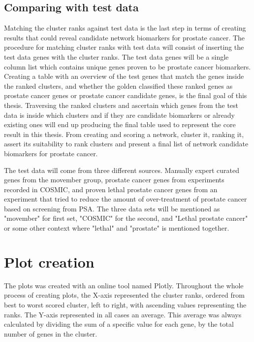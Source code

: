 \subsection{Comparing with test data}
Matching the cluster ranks against test data is the last step in terms of
creating results that could reveal candidate network biomarkers for prostate
cancer. The procedure for matching cluster ranks with test data will consist of
inserting the test data genes with the cluster ranks. The test data genes will
be a single column list which contains unique genes proven to be prostate cancer
biomarkers. Creating a table with an overview of the test genes that match
the genes inside the ranked clusters, and whether the \gls{golden} classified
these ranked genes as prostate cancer genes or prostate cancer candidate genes,
is the final goal of this thesis. Traversing the ranked clusters and ascertain
which genes from the test data is inside which clusters and if they are
candidate biomarkers or already existing ones will end up producing the final
table used to represent the core result in this thesis. From creating and
scoring a network, cluster it, ranking it, assert its suitability to rank
clusters and present a final list of network candidate biomarkers for prostate
cancer.

The test data will come from three different sources. Manually expert curated
genes from the movember group, prostate cancer genes from experiments recorded
in COSMIC\cite{cosmic-download}, and proven lethal prostate cancer genes from an
experiment that tried to reduce the amount of over-treatment of prostate cancer
based on screening from PSA\cite{psa-overtreatment}. The three data sets will be
mentioned as "movember" for first set, "COSMIC" for the second, and "Lethal
prostate cancer" or some other context where "lethal" and "prostate" is
mentioned together.

\section{Plot creation}
The plots was created with an online tool named Plotly\cite{plotly}. Throughout
the whole process of creating plots, the X-axis represented the cluster ranks,
ordered from best to worst scored cluster, left to right, with ascending values
representing the ranks. The Y-axis represented in all cases an average. This
average was always calculated by dividing the sum of a specific value for each
gene, by the total number of genes in the cluster.

